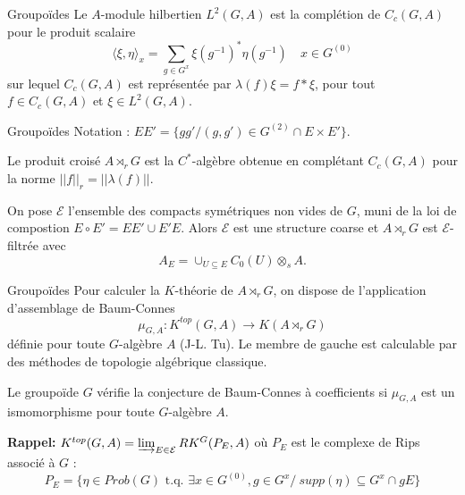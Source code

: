 \begin{frame}{Groupoïdes}
Le $A$-module hilbertien $L^2(G,A)$ est la complétion de $C_c(G,A)$ pour le produit scalaire 
\[\langle \xi ,\eta \rangle_x  = \sum_{g\in G^x} \xi(g^{-1})^* \eta(g^{-1}) \quad x\in G^{(0)} \]
sur lequel $C_c(G,A)$ est représentée par $\lambda(f) \xi = f\ast \xi$, pour tout $ f\in C_c(G,A)$ et $\xi\in L^2(G,A)$.\\
\end{frame}

\begin{frame}{Groupoïdes}
Notation : $EE' = \{gg' / (g,g')\in G^{(2)}\cap E\times E'\}$.
\vspace{0.3 cm}
\begin{definitionfr}
Le produit croisé $A\rtimes_r G$ est la $C^*$-algèbre obtenue en complétant $C_c(G,A)$ pour la norme $||f||_r=||\lambda(f)||$.
\end{definitionfr}
\vspace{0.3 cm}
On pose $\mathcal E$ l'ensemble des compacts symétriques non vides de $G$, muni de la loi de compostion $E\circ E' = EE' \cup E'E$. Alors $\mathcal E$ est une structure coarse et $A\rtimes_r G$ est $\mathcal E$-filtrée avec
\[A_E = \cup_{U\subseteq E	} C_0(U)\otimes_s A.\] 
\end{frame}

\begin{frame}{Groupoïdes}
Pour calculer la $K$-théorie de $A\rtimes_r G$, on dispose de l'application d'assemblage de Baum-Connes
\[\mu_{G,A} : K^{top}(G,A) \rightarrow K(A \rtimes_r G)\]
définie pour toute $G$-algèbre $A$ (J-L. Tu). Le membre de gauche est calculable par des méthodes de topologie algébrique classique.
\vspace{0.3 cm}
\begin{conj}
Le groupoïde $G$ vérifie la conjecture de Baum-Connes à coefficients si $\mu_{G,A}$ est un ismomorphisme pour toute $G$-algèbre $A$.
\end{conj}
\vspace{0.3 cm}
\textbf{Rappel:} $K^{top}(G,A)=\varinjlim_{E\in \mathcal E} RK^G(P_E,A)$ où $P_E$ est le complexe de Rips associé à $G$ :
\[P_E = \{\eta\in Prob(G) \text{ t.q. } \exists x\in G^{(0)},g\in G^x / \ supp (\eta) \subseteq G^x \cap gE  \}\]
\end{frame}

